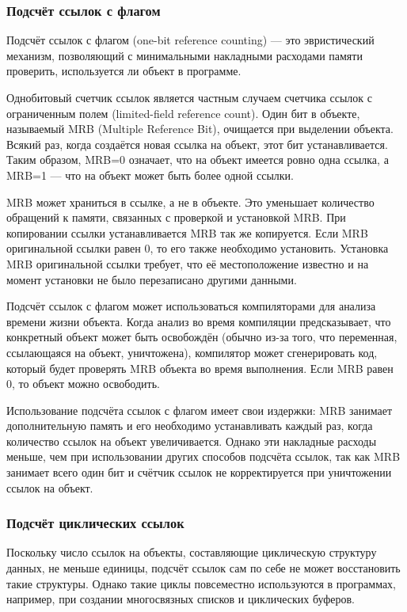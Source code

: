 \subsubsection{Подсчёт ссылок с флагом}

Подсчёт ссылок с флагом (one-bit reference counting) \cite{glossary} --- это эвристический механизм, позволяющий с минимальными накладными расходами памяти проверить, используется ли объект в программе.

Однобитовый счетчик ссылок является частным случаем счетчика ссылок с ограниченным полем (limited-field reference count). Один бит в объекте, называемый MRB (Multiple Reference Bit), очищается при выделении объекта. Всякий раз, когда создаётся новая ссылка на объект, этот бит устанавливается. Таким образом, MRB=0 означает, что на объект имеется ровно одна ссылка, а MRB=1 --- что на объект может быть более одной ссылки. \cite{glossary}

MRB может храниться в ссылке, а не в объекте. Это уменьшает количество обращений к памяти, связанных с проверкой и установкой MRB. При копировании ссылки устанавливается MRB так же копируется. Если MRB оригинальной ссылки равен 0, то его также необходимо установить. Установка MRB оригинальной ссылки требует, что её местоположение известно и на момент установки не было перезаписано другими данными. \cite{glossary}

Подсчёт ссылок с флагом может использоваться компиляторами для анализа времени жизни объекта. Когда анализ во время компиляции предсказывает, что конкретный объект может быть освобождён (обычно из-за того, что переменная, ссылающаяся на объект, уничтожена), компилятор может сгенерировать код, который будет проверять MRB объекта во время выполнения. Если MRB равен 0, то объект можно освободить. \cite{glossary}

Использование подсчёта ссылок с флагом имеет свои издержки: MRB занимает дополнительную память и его необходимо устанавливать каждый раз, когда количество ссылок на объект увеличивается. Однако эти накладные расходы меньше, чем при использовании других способов подсчёта ссылок, так как MRB занимает всего один бит и счётчик ссылок не корректируется при уничтожении ссылок на объект. \cite{glossary}

\subsubsection{Подсчёт циклических ссылок}

Поскольку число ссылок на объекты, составляющие циклическую структуру данных, не меньше единицы, подсчёт ссылок сам по себе не может восстановить такие структуры. Однако
такие циклы повсеместно используются в программах, например, при создании многосвязных списков и циклических буферов. \cite{handbook}

